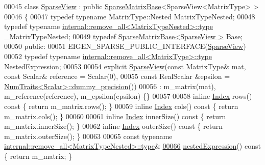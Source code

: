 \begin{DoxyCode}
00045 \textcolor{keyword}{class }\hyperlink{group___sparse_core___module_class_eigen_1_1_sparse_view}{SparseView} : \textcolor{keyword}{public} \hyperlink{group___sparse_core___module_class_eigen_1_1_sparse_matrix_base}{SparseMatrixBase}<SparseView<MatrixType> >
00046 \{
00047   \textcolor{keyword}{typedef} \textcolor{keyword}{typename} MatrixType::Nested MatrixTypeNested;
00048   \textcolor{keyword}{typedef} \textcolor{keyword}{typename} \hyperlink{group___sparse_core___module}{internal::remove\_all<MatrixTypeNested>::type}
       \_MatrixTypeNested;
00049   \textcolor{keyword}{typedef} \hyperlink{group___sparse_core___module_class_eigen_1_1_sparse_matrix_base}{SparseMatrixBase<SparseView >} Base;
00050 \textcolor{keyword}{public}:
00051   EIGEN\_SPARSE\_PUBLIC\_INTERFACE(\hyperlink{group___sparse_core___module_class_eigen_1_1_sparse_view}{SparseView})
00052   \textcolor{keyword}{typedef} \textcolor{keyword}{typename} \hyperlink{group___sparse_core___module}{internal::remove\_all<MatrixType>::type} 
      NestedExpression;
00053 
00054   \textcolor{keyword}{explicit} \hyperlink{group___sparse_core___module_class_eigen_1_1_sparse_view}{SparseView}(\textcolor{keyword}{const} MatrixType& mat, \textcolor{keyword}{const} Scalar& reference = Scalar(0),
00055                       \textcolor{keyword}{const} RealScalar &epsilon = 
      \hyperlink{group___core___module_struct_eigen_1_1_num_traits}{NumTraits<Scalar>::dummy\_precision}())
00056     : m\_matrix(mat), m\_reference(reference), m\_epsilon(epsilon) \{\}
00057 
00058   \textcolor{keyword}{inline} \hyperlink{namespace_eigen_a62e77e0933482dafde8fe197d9a2cfde}{Index} rows()\textcolor{keyword}{ const }\{ \textcolor{keywordflow}{return} m\_matrix.rows(); \}
00059   \textcolor{keyword}{inline} \hyperlink{namespace_eigen_a62e77e0933482dafde8fe197d9a2cfde}{Index} cols()\textcolor{keyword}{ const }\{ \textcolor{keywordflow}{return} m\_matrix.cols(); \}
00060 
00061   \textcolor{keyword}{inline} \hyperlink{namespace_eigen_a62e77e0933482dafde8fe197d9a2cfde}{Index} innerSize()\textcolor{keyword}{ const }\{ \textcolor{keywordflow}{return} m\_matrix.innerSize(); \}
00062   \textcolor{keyword}{inline} \hyperlink{namespace_eigen_a62e77e0933482dafde8fe197d9a2cfde}{Index} outerSize()\textcolor{keyword}{ const }\{ \textcolor{keywordflow}{return} m\_matrix.outerSize(); \}
00063   
00065   \textcolor{keyword}{const} \textcolor{keyword}{typename} \hyperlink{group___sparse_core___module}{internal::remove\_all<MatrixTypeNested>::type}&
\hyperlink{group___sparse_core___module_a50f53a9405017012077ae907959aca14}{00066}   \hyperlink{group___sparse_core___module_a50f53a9405017012077ae907959aca14}{nestedExpression}()\textcolor{keyword}{ const }\{ \textcolor{keywordflow}{return} m\_matrix; \}

\end{DoxyCode}
